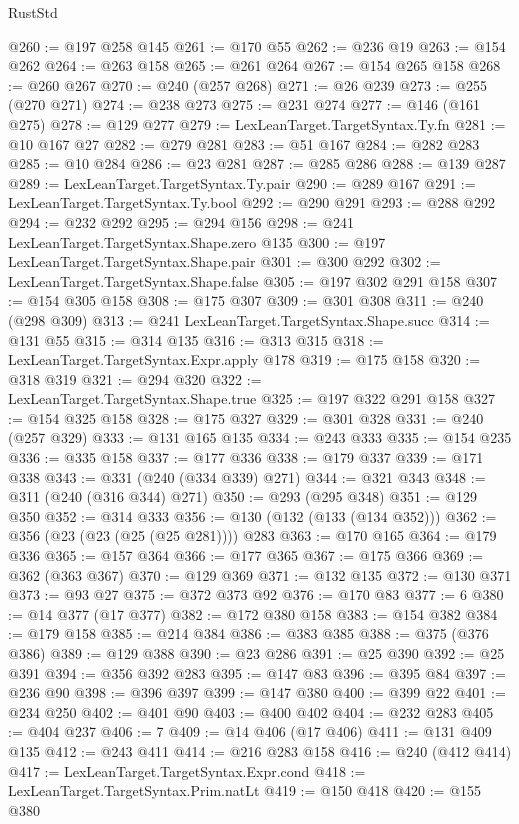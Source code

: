 \begin{lexlean}{RustStd}
\begin{coremodule}
@260 := @197 @258 @145
@261 := @170 @55
@262 := @236 @19
@263 := @154 @262
@264 := @263 @158
@265 := @261 @264
@267 := @154 @265 @158
@268 := @260 @267
@270 := @240 (@257 @268)
@271 := @26 @239
@273 := @255 (@270 @271)
@274 := @238 @273
@275 := @231 @274
@277 := @146 (@161 @275)
@278 := @129 @277
@279 := LexLeanTarget.TargetSyntax.Ty.fn
@281 := @10 @167 @27
@282 := @279 @281
@283 := @51 @167
@284 := @282 @283
@285 := @10 @284
@286 := @23 @281
@287 := @285 @286
@288 := @139 @287
@289 := LexLeanTarget.TargetSyntax.Ty.pair
@290 := @289 @167
@291 := LexLeanTarget.TargetSyntax.Ty.bool
@292 := @290 @291
@293 := @288 @292
@294 := @232 @292
@295 := @294 @156
@298 := @241 LexLeanTarget.TargetSyntax.Shape.zero @135
@300 := @197 LexLeanTarget.TargetSyntax.Shape.pair
@301 := @300 @292
@302 := LexLeanTarget.TargetSyntax.Shape.false
@305 := @197 @302 @291 @158
@307 := @154 @305 @158
@308 := @175 @307
@309 := @301 @308
@311 := @240 (@298 @309)
@313 := @241 LexLeanTarget.TargetSyntax.Shape.succ
@314 := @131 @55
@315 := @314 @135
@316 := @313 @315
@318 := LexLeanTarget.TargetSyntax.Expr.apply @178
@319 := @175 @158
@320 := @318 @319
@321 := @294 @320
@322 := LexLeanTarget.TargetSyntax.Shape.true
@325 := @197 @322 @291 @158
@327 := @154 @325 @158
@328 := @175 @327
@329 := @301 @328
@331 := @240 (@257 @329)
@333 := @131 @165 @135
@334 := @243 @333
@335 := @154 @235
@336 := @335 @158
@337 := @177 @336
@338 := @179 @337
@339 := @171 @338
@343 := @331 (@240 (@334 @339) @271)
@344 := @321 @343
@348 := @311 (@240 (@316 @344) @271)
@350 := @293 (@295 @348)
@351 := @129 @350
@352 := @314 @333
@356 := @130 (@132 (@133 (@134 @352)))
@362 := @356 (@23 (@23 (@25 (@25 @281)))) @283
@363 := @170 @165
@364 := @179 @336
@365 := @157 @364
@366 := @177 @365
@367 := @175 @366
@369 := @362 (@363 @367)
@370 := @129 @369
@371 := @132 @135
@372 := @130 @371
@373 := @93 @27
@375 := @372 @373 @92
@376 := @170 @83
@377 := 6
@380 := @14 @377 (@17 @377)
@382 := @172 @380 @158
@383 := @154 @382
@384 := @179 @158
@385 := @214 @384
@386 := @383 @385
@388 := @375 (@376 @386)
@389 := @129 @388
@390 := @23 @286
@391 := @25 @390
@392 := @25 @391
@394 := @356 @392 @283
@395 := @147 @83
@396 := @395 @84
@397 := @236 @90
@398 := @396 @397
@399 := @147 @380
@400 := @399 @22
@401 := @234 @250
@402 := @401 @90
@403 := @400 @402
@404 := @232 @283
@405 := @404 @237
@406 := 7
@409 := @14 @406 (@17 @406)
@411 := @131 @409 @135
@412 := @243 @411
@414 := @216 @283 @158
@416 := @240 (@412 @414)
@417 := LexLeanTarget.TargetSyntax.Expr.cond
@418 := LexLeanTarget.TargetSyntax.Prim.natLt
@419 := @150 @418
@420 := @155 @380

\end{coremodule}
\end{lexlean}
